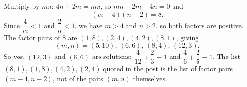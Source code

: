 Multiply by $mn$: $4n+2m=mn$, so $mn-2m-4n=0$ and
\[
(m-4)(n-2)=8 .
\]
Since $\dfrac{4}{m}<1$ and $\dfrac{2}{n}<1$, we have $m>4$ and $n>2$, so both factors are positive. The factor pairs of $8$ are $(1,8),(2,4),(4,2),(8,1)$, giving
\[
\boxed{(m,n)=(5,10),\ (6,6),\ (8,4),\ (12,3)} .
\]
So yes, $(12,3)$ and $(6,6)$ are solutions: $\dfrac{4}{12}+\dfrac{2}{3}=1$ and $\dfrac{4}{6}+\dfrac{2}{6}=1$. The list $(8,1),(1,8),(4,2),(2,4)$ quoted in the post is the list of factor pairs $(m-4,n-2)$, not of the pairs $(m,n)$ themselves.
